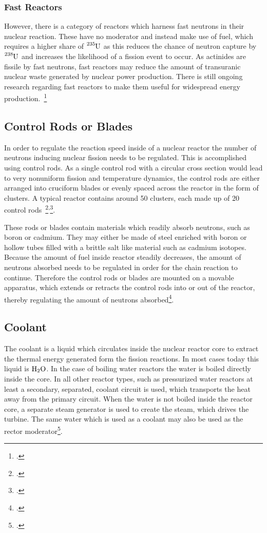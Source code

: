 \subsubsection{Fast Reactors}
However, there is a category of reactors which harness fast neutrons in their nuclear reaction.
These have no moderator and instead make use of fuel, which requires a higher share of $\ce{^{235}U}$
as this reduces the chance of neutron capture by $\ce{^{238}U}$ and increases the likelihood of a fission event to occur.
As actinides are fissile by fast neutrons, fast reactors may reduce the amount of transuranic nuclear waste
generated by nuclear power production. There is still ongoing research regarding fast reactors to make
them useful for widespread energy production.~\footcite{WNPR}


\subsection{Control Rods or Blades}
In order to regulate the reaction speed inside of a nuclear reactor the number of neutrons inducing
nuclear fission needs to be regulated. This is accomplished using control rods.
As a single control rod with a circular cross section would lead to very nonuniform fission and
temperature dynamics, the control rods are either arranged into cruciform blades or evenly spaced
across the reactor in the form of clusters. A typical reactor contains around 50 clusters, each
made up of 20 control rods~\footcite[72]{ReactorPhysics}\textsuperscript{,}\footcite{grayson}.

These rods or blades contain materials which readily absorb neutrons, such as boron or cadmium. %
They may either be made of steel enriched with boron or hollow tubes filled with a brittle salt like material such as cadmium isotopes.
Because the amount of fuel inside reactor steadily decreases, the amount of neutrons absorbed needs to
be regulated in order for the chain reaction to continue. Therefore the control rods or blades are
mounted on a movable apparatus, which extends or retracts the control rods into or out of the reactor,
thereby regulating the amount of neutrons absorbed\footcite{grayson}.

\subsection{Coolant}
The coolant is a liquid which circulates inside the nuclear reactor core to extract the thermal energy
generated form the fission reactions. In most cases today this liquid is $\ce{H_{2}O}$. In the case
of boiling water reactors the water is boiled directly inside the core. In all other reactor types,
such as pressurized water reactors at least a secondary, separated, coolant circuit is used, which
transports the heat away from the primary circuit. When the water is not boiled inside the reactor
core, a separate steam generator is used to create the steam, which drives the turbine. The same
water which is used as a coolant may also be used as the rector moderator\footcite{WNPR}.